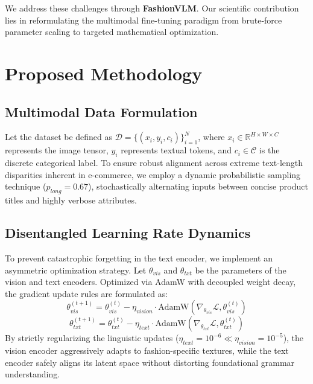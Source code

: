 \documentclass[conference]{IEEEtran}
\begin{document}
We address these challenges through \textbf{FashionVLM}. Our scientific contribution lies in reformulating the multimodal fine-tuning paradigm from brute-force parameter scaling to targeted mathematical optimization.

\section{Proposed Methodology}

\subsection{Multimodal Data Formulation}
Let the dataset be defined as $\mathcal{D} = \{(x_i, y_i, c_i)\}_{i=1}^N$, where $x_i \in \mathbb{R}^{H \times W \times C}$ represents the image tensor, $y_i$ represents textual tokens, and $c_i \in \mathcal{C}$ is the discrete categorical label. To ensure robust alignment across extreme text-length disparities inherent in e-commerce, we employ a dynamic probabilistic sampling technique ($p_{long} = 0.67$), stochastically alternating inputs between concise product titles and highly verbose attributes.

\subsection{Disentangled Learning Rate Dynamics}
To prevent catastrophic forgetting in the text encoder, we implement an asymmetric optimization strategy. Let $\theta_{vis}$ and $\theta_{txt}$ be the parameters of the vision and text encoders. Optimized via AdamW with decoupled weight decay, the gradient update rules are formulated as:
\begin{equation}
    \theta_{vis}^{(t+1)} = \theta_{vis}^{(t)} - \eta_{vision} \cdot \text{AdamW}(\nabla_{\theta_{vis}} \mathcal{L}, \theta_{vis}^{(t)})
    \label{eq:update_vis}
\end{equation}
\begin{equation}
    \theta_{txt}^{(t+1)} = \theta_{txt}^{(t)} - \eta_{text} \cdot \text{AdamW}(\nabla_{\theta_{txt}} \mathcal{L}, \theta_{txt}^{(t)})
    \label{eq:update_txt}
\end{equation}
By strictly regularizing the linguistic updates ($\eta_{text} = 10^{-6} \ll \eta_{vision} = 10^{-5}$), the vision encoder aggressively adapts to fashion-specific textures, while the text encoder safely aligns its latent space without distorting foundational grammar understanding.
\end{document}
